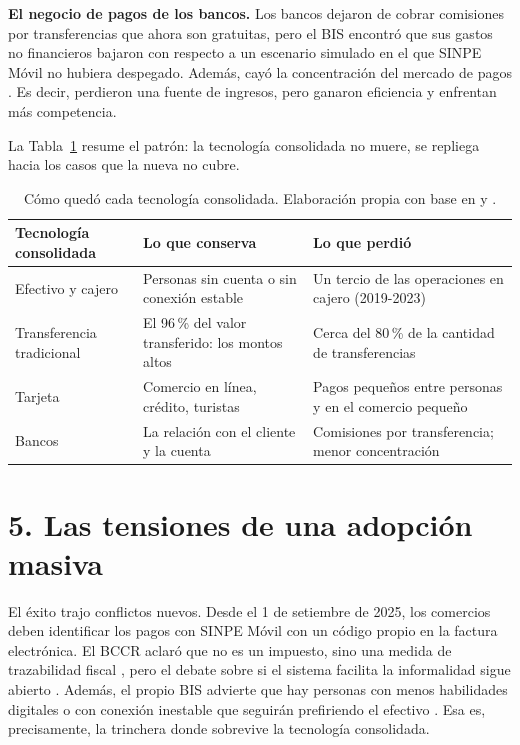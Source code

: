 \documentclass[11pt,letterpaper]{article}
\begin{document}
\textbf{El negocio de pagos de los bancos.} Los bancos dejaron de cobrar
comisiones por transferencias que ahora son gratuitas, pero el BIS encontró que
sus gastos no financieros bajaron con respecto a un escenario simulado en el que
SINPE Móvil no hubiera despegado. Además, cayó la concentración del mercado de
pagos \parencite{araujo2024}. Es decir, perdieron una fuente de ingresos, pero
ganaron eficiencia y enfrentan más competencia.

La Tabla~\ref{tab:resumen} resume el patrón: la tecnología consolidada no
muere, se repliega hacia los casos que la nueva no cubre.

\begin{table}[H]
\centering
\small
\renewcommand{\arraystretch}{1.25}
\begin{tabular}{>{\raggedright\arraybackslash}p{3.3cm}
                >{\raggedright\arraybackslash}p{5.6cm}
                >{\raggedright\arraybackslash}p{5.6cm}}
\toprule
\textbf{Tecnología consolidada} & \textbf{Lo que conserva} & \textbf{Lo que perdió} \\
\midrule
Efectivo y cajero & Personas sin cuenta o sin conexión estable & Un tercio de las operaciones en cajero (2019-2023) \\
Transferencia tradicional & El 96\,\% del valor transferido: los montos altos & Cerca del 80\,\% de la cantidad de transferencias \\
Tarjeta & Comercio en línea, crédito, turistas & Pagos pequeños entre personas y en el comercio pequeño \\
Bancos & La relación con el cliente y la cuenta & Comisiones por transferencia; menor concentración \\
\bottomrule
\end{tabular}
\caption{Cómo quedó cada tecnología consolidada. Elaboración propia con base en
\Textcite{araujo2024} y \Textcite{alvarado2022}.}
\label{tab:resumen}
\end{table}

\section*{5. Las tensiones de una adopción masiva}

El éxito trajo conflictos nuevos. Desde el 1 de setiembre de 2025, los comercios
deben identificar los pagos con SINPE Móvil con un código propio en la factura
electrónica. El BCCR aclaró que no es un impuesto, sino una medida de
trazabilidad fiscal \parencite{bccr2025fiscal}, pero el debate sobre si el
sistema facilita la informalidad sigue abierto \parencite{rivero2026}. Además,
el propio BIS advierte que hay personas con menos habilidades digitales o con
conexión inestable que seguirán prefiriendo el efectivo \parencite{araujo2024}.
Esa es, precisamente, la trinchera donde sobrevive la tecnología consolidada.
\end{document}
